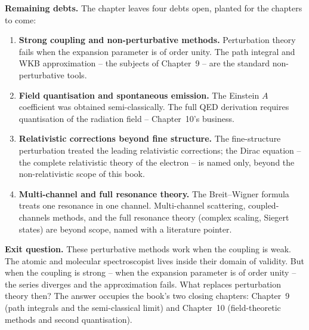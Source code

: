 \medskip\noindent\textbf{Remaining debts.}
The chapter leaves four debts open, planted for the chapters to come:
\begin{enumerate}
\item \textbf{Strong coupling and non-perturbative methods.} Perturbation theory fails when the expansion parameter is of order unity. The path integral and WKB approximation -- the subjects of Chapter~9 -- are the standard non-perturbative tools.
\item \textbf{Field quantisation and spontaneous emission.} The Einstein $A$ coefficient was obtained semi-classically. The full QED derivation requires quantisation of the radiation field -- Chapter~10's business.
\item \textbf{Relativistic corrections beyond fine structure.} The fine-structure perturbation treated the leading relativistic corrections; the Dirac equation -- the complete relativistic theory of the electron -- is named only, beyond the non-relativistic scope of this book.
\item \textbf{Multi-channel and full resonance theory.} The Breit--Wigner formula treats one resonance in one channel. Multi-channel scattering, coupled-channels methods, and the full resonance theory (complex scaling, Siegert states) are beyond scope, named with a literature pointer.
\end{enumerate}

\medskip\noindent\textbf{Exit question.}
These perturbative methods work when the coupling is weak. The atomic and molecular spectroscopist lives inside their domain of validity. But when the coupling is strong -- when the expansion parameter is of order unity -- the series diverges and the approximation fails. What replaces perturbation theory then? The answer occupies the book's two closing chapters: Chapter~9 (path integrals and the semi-classical limit) and Chapter~10 (field-theoretic methods and second quantisation).

